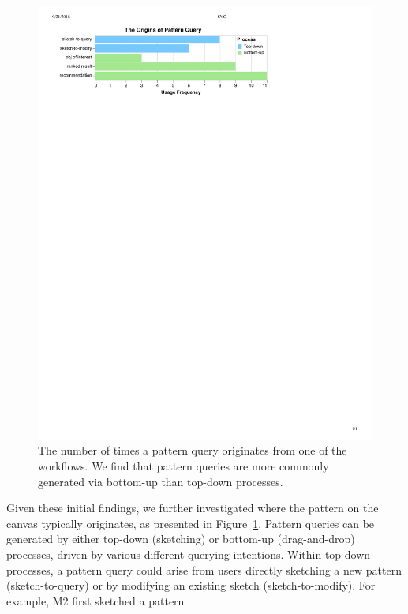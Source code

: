\begin{figure}[h!]
  \includegraphics[width=\linewidth]{figures/the_origins_of_sketch.pdf}
  \vspace{-5pt}
  \caption{The number of times a pattern query originates from one of the workflows. We find that pattern queries are more commonly generated via bottom-up than top-down processes.}\label{fig:origins_of_sketch}
  \vspace{-5pt}
\end{figure}
\par Given these initial findings,
we further investigated where the pattern
on the canvas typically originates, as presented in Figure~\ref{fig:origins_of_sketch}.
Pattern queries can be generated by
either top-down (sketching) or
bottom-up (drag-and-drop) processes,
driven by various different querying intentions.
Within top-down processes,
a pattern query could arise
from users directly sketching
a new pattern (sketch-to-query)
or by modifying an existing sketch (sketch-to-modify). For example, M2 first sketched a pattern
